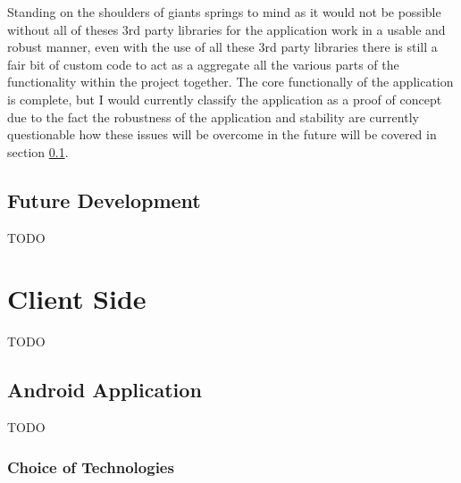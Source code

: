 \noindent
Standing on the shoulders of giants springs to mind as it would not be possible without all of theses 3rd party libraries for the application work in a usable and robust manner, even with the use of all these 3rd party libraries there is still a fair bit of custom code to act as a aggregate all the various parts of the functionality within the project together. The core functionally of the application is complete, but I would currently classify the application as a proof of concept due to the fact the robustness of the application and stability are currently questionable how these issues will be overcome in the future will be covered in section \ref{sec:development_future_dev}.\\

\subsection{Future Development}
\label{sec:development_future_dev}

{TODO}





\section{Client Side}

{TODO}

\subsection{Android Application}

{TODO}

\subsubsection*{Choice of Technologies}
\label{sec:android_choice_of_tech}

